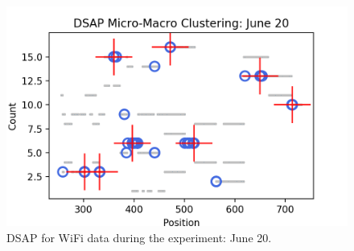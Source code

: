 \begin{figure}[!h]
    \centering
    \includegraphics[width = 9 cm]{image/Chapters/Chapter6/DSAPJune20.png}\hfill
    \caption{ DSAP  for WiFi data during the experiment: June 20.}
    \label{dsapjun20}
\end{figure}









